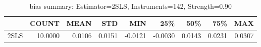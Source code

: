 \begin{table}[ht]
\centering
\caption{bias summary: Estimator=2SLS, Instruments=142, Strength=0.90}
\begin{tabular}{lrrrrrrrr}
\toprule
 & COUNT & MEAN & STD & MIN & 25\% & 50\% & 75\% & MAX \\
\midrule
2SLS & 10.0000 & 0.0106 & 0.0151 & -0.0121 & -0.0030 & 0.0143 & 0.0231 & 0.0307 \\
\bottomrule
\end{tabular}
\end{table}

